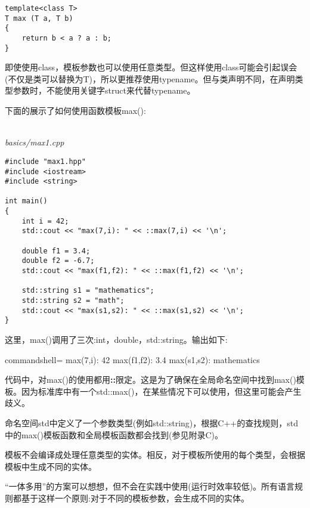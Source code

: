 \begin{lstlisting}[style=styleCXX]
template<class T>
T max (T a, T b)
{
	return b < a ? a : b;
}
\end{lstlisting}

即使使用class，模板参数也可以使用任意类型。但这样使用class可能会引起误会(不仅是类可以替换为T)，所以更推荐使用typename。但与类声明不同，在声明类型参数时，不能使用关键字struct来代替typename。


下面的展示了如何使用函数模板max():

\hspace*{\fill} \\ %
\noindent
\textit{basics/max1.cpp}
\begin{lstlisting}[style=styleCXX]
#include "max1.hpp"
#include <iostream>
#include <string>

int main()
{
	int i = 42;
	std::cout << "max(7,i): " << ::max(7,i) << '\n';
	
	double f1 = 3.4;
	double f2 = -6.7;
	std::cout << "max(f1,f2): " << ::max(f1,f2) << '\n';
	
	std::string s1 = "mathematics";
	std::string s2 = "math";
	std::cout << "max(s1,s2): " << ::max(s1,s2) << '\n';
}
\end{lstlisting}

这里，max()调用了三次:int，double，std::string。输出如下:

\begin{tcblisting}{commandshell={}}
max(7,i): 42
max(f1,f2): 3.4
max(s1,s2): mathematics
\end{tcblisting}

代码中，对max()的使用都用\textbf{::}限定。这是为了确保在全局命名空间中找到max()模板。因为标准库中有一个std::max()，在某些情况下可以使用，但这里可能会产生歧义。

\begin{tcolorbox}[colback=webgreen!5!white,colframe=webgreen!75!black]
\hspace*{0.75cm}命名空间std中定义了一个参数类型(例如std::string)，根据C++的查找规则，std中的max()模板函数和全局模板函数都会找到(参见附录C)。
\end{tcolorbox}

模板不会编译成处理任意类型的实体。相反，对于模板所使用的每个类型，会根据模板中生成不同的实体。

\begin{tcolorbox}[colback=webgreen!5!white,colframe=webgreen!75!black]
\hspace*{0.75cm}“一体多用”的方案可以想想，但不会在实践中使用(运行时效率较低)。所有语言规则都基于这样一个原则:对于不同的模板参数，会生成不同的实体。
\end{tcolorbox}

